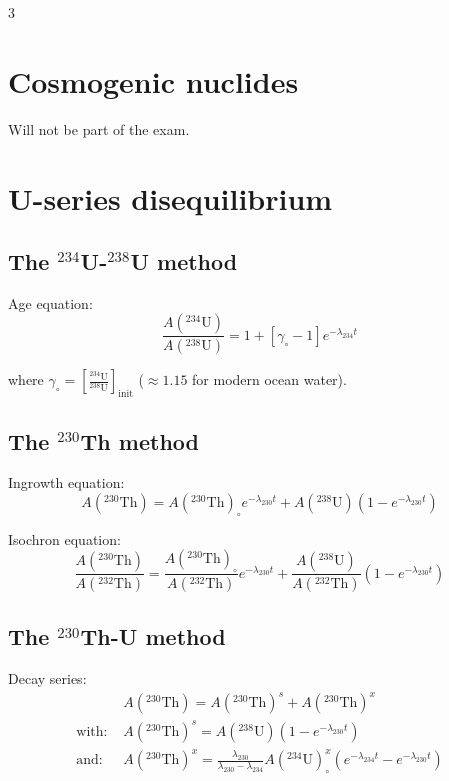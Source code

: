 \documentclass{article}
\begin{document}
\begin{multicols}{3}
\section[Cosmogenic Nuclides]{Cosmogenic nuclides}
\label{sec:cosmo}

Will not be part of the exam.

\section[U-series dating]{U-series disequilibrium}
\label{ch:intro2Useries}

\subsection{The $^{234}$U-$^{238}$U method}
\label{sec:234238}

Age equation:
\begin{equation}
\frac{A(^{234}\mbox{U})}{A(^{238}\mbox{U})} = 1 + [ \gamma_\circ - 1 ] e^{-\lambda_{234}t} 
\label{eq:A234A238}
\end{equation}

\noindent where $\gamma_\circ =
\left[\frac{{}^{234}\mbox{U}}{{}^{238}\mbox{U}}\right]_{\mbox{init}}$ ($\approx 1.15$
for modern ocean water).

\subsection{The $^{230}$Th method}
\label{sec:230}

Ingrowth equation:
\begin{equation}
A(^{230}\mbox{Th}) = A(^{230}\mbox{Th})_\circ e^{-\lambda_{230}t} + A(^{238}\mbox{U})(1-e^{-\lambda_{230}t})
\label{eq:A230}
\end{equation}

Isochron equation:
\begin{equation}
  \frac{A(^{230}\mbox{Th})}{A(^{232}\mbox{Th})} =
  \frac{A(^{230}\mbox{Th})_\circ}{A(^{232}\mbox{Th})} e^{-\lambda_{230}t} + 
  \frac{A(^{238}\mbox{U})}{A(^{232}\mbox{Th})}(1-e^{-\lambda_{230}t})
\label{eq:230232}
\end{equation}

\subsection{The $^{230}$Th-U method}
\label{sec:230238}

Decay series:
\begin{align}
~ & A(^{230}\mbox{Th}) =  A(^{230}\mbox{Th})^s + A(^{230}\mbox{Th})^x \label{eq:230total}\\
\mbox{with:~} & A(^{230}\mbox{Th})^s = A(^{238}\mbox{U}) (1-e^{-\lambda_{230}t}) \label{eq:230s}\\
\mbox{and:~} & A(^{230}\mbox{Th})^x = \frac{\lambda_{230}}{\lambda_{230}-\lambda_{234}} 
A(^{234}\mbox{U})_\circ^x\left(e^{-\lambda_{234}t}-e^{-\lambda_{230}t}\right) \label{eq:230x}
\end{align}


\end{multicols}
\end{document}
